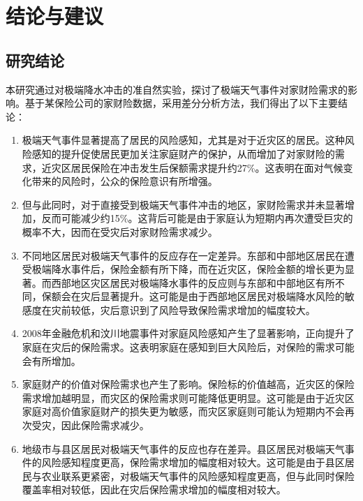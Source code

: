 \chapter{结论与建议}\label{chap:5}

\section{研究结论}

本研究通过对极端降水冲击的准自然实验，探讨了极端天气事件对家财险需求的影响。基于某保险公司的家财险数据，采用差分分析方法，我们得出了以下主要结论：
\begin{enumerate}
    \item 极端天气事件显著提高了居民的风险感知，尤其是对于近灾区的居民。这种风险感知的提升促使居民更加关注家庭财产的保护，从而增加了对家财险的需求，近灾区居民保险在冲击发生后保额需求提升约27\%。这表明在面对气候变化带来的风险时，公众的保险意识有所增强。

    \item 但与此同时，对于直接受到极端天气事件冲击的地区，家财险需求并未显著增加，反而可能减少约15\%。这背后可能是由于家庭认为短期内再次遭受巨灾的概率不大，因而在受灾后对家财险需求减少。

    \item 不同地区居民对极端天气事件的反应存在一定差异。东部和中部地区居民在遭受极端降水事件后，保险金额有所下降，而在近灾区，保险金额的增长更为显著。而西部地区灾区居民对极端降水事件的反应则与东部和中部地区有所不同，保额会在灾后显著提升。这可能是由于西部地区居民对极端降水风险的敏感度在灾前较低，灾后意识到了风险导致保险需求增加的幅度较大。

    \item 2008年金融危机和汶川地震事件对家庭风险感知产生了显著影响，正向提升了家庭在灾后的保险需求。这表明家庭在感知到巨大风险后，对保险的需求可能会有所增加。

    \item 家庭财产的价值对保险需求也产生了影响。保险标的价值越高，近灾区的保险需求增加越明显，而灾区的保险需求则可能降低更明显。这可能是由于近灾区家庭对高价值家庭财产的损失更为敏感，而灾区家庭则可能认为短期内不会再次受灾，因此保险需求减少。

    \item 地级市与县区居民对极端天气事件的反应也存在差异。县区居民对极端天气事件的风险感知程度更高，保险需求增加的幅度相对较大。这可能是由于县区居民与农业联系更紧密，对极端天气事件的风险感知程度更高，但与此同时保险覆盖率相对较低，因此在灾后保险需求增加的幅度相对较大。
\end{enumerate}

